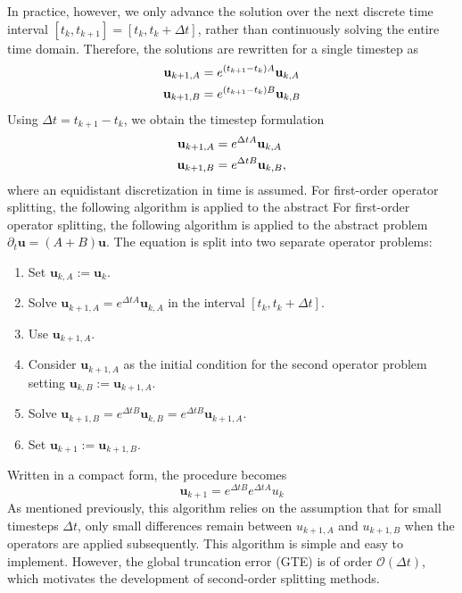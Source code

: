 In practice, however, we only advance the solution over the next discrete
time interval $[t_k, t_{k+1}]=[t_k, t_k + \Delta t]$, rather than continuously solving
the entire time domain. Therefore, the solutions are
rewritten for a single timestep as
\begin{align}
    \textbf u_{k+1, A} &= e^{(t_{k+1} - t_k) A}\textbf u_{k, A} \\
    \textbf u_{k+1, B} &= e^{(t_{k+1} - t_k) B}\textbf u_{k, B} 
\end{align}
Using $\Delta t = t_{k+1}-t_k$, we obtain the timestep formulation
\begin{align}
    \textbf u_{k+1, A} &= e^{\Delta t A}\textbf u_{k, A} \\
    \textbf u_{k+1, B} &= e^{\Delta t B}\textbf u_{k, B},
\end{align}
where an equidistant discretization in time is assumed. 
For first-order operator splitting, the following algorithm is applied to the abstract For first-order operator splitting, the following algorithm is applied to
the abstract problem $\partial_t \bm{u}= (A+B)\bm{u}$. The equation is
split into two separate operator problems:
\begin{enumerate}
    \item{Set $\bm{u}_{k,A}:= \bm{u}_k$.}
    \item{Solve $\bm{u}_{k+1, A} = e^{\Delta t A}\bm u_{k, A}$ in the
            interval $[t_{k}, t_k+\Delta t].$}
    \item{Use $\bm{u}_{k+1, A}$.}    
    \item{Consider $\bm{u}_{k+1, A}$ as the initial condition for the 
            second operator problem setting
            $\bm{u}_{k,B}:=\bm{u}_{k+1,A}.$}
    \item{Solve $\bm{u}_{k+1, B} = e^{\Delta t B}\bm{u}_{k, B}
            =e^{\Delta t B}\bm{u}_{k+1, A}$.}
    \item {Set $\bm{u}_{k+1} := \bm{u}_{k+1,B}$.}
\end{enumerate}
Written in a compact form, the procedure becomes
$$\bm u_{k+1}= e^{\Delta t B}e^{\Delta t A}u_k$$
As mentioned previously, this algorithm relies on the assumption that for
small timesteps $\Delta t$, only small differences remain between 
$u_{k+1,A}$ and $u_{k+1,B}$ when the operators are applied subsequently.
This algorithm is simple and easy to implement. 
However, the global truncation error (GTE) is of order
$\mathcal{O}(\Delta t)$, which motivates the
development of second-order splitting methods.


